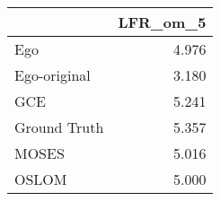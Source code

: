 \begin{tabular}{lr}
\toprule
{} & LFR_om_5 \\
\midrule
Ego          &    4.976 \\
Ego-original &    3.180 \\
GCE          &    5.241 \\
Ground Truth &    5.357 \\
MOSES        &    5.016 \\
OSLOM        &    5.000 \\
\bottomrule
\end{tabular}
